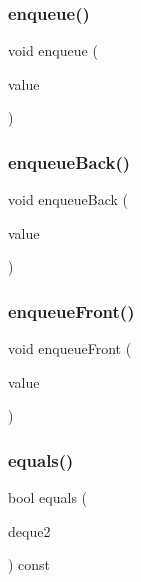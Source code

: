 \mbox{\label{classDeque_a663f69ed5d98f3f167202e9b2d7e7a9a}} 
\subsubsection{\texorpdfstring{enqueue()}{enqueue()}}
{\footnotesize\ttfamily void enqueue (\begin{DoxyParamCaption}\item[{const Value\+Type \&}]{value }\end{DoxyParamCaption})}

\mbox{\label{classDeque_a2fdd7308cc72a3bd03dd6345ef778a65}} 
\subsubsection{\texorpdfstring{enqueue\+Back()}{enqueueBack()}}
{\footnotesize\ttfamily void enqueue\+Back (\begin{DoxyParamCaption}\item[{const Value\+Type \&}]{value }\end{DoxyParamCaption})}

\mbox{\label{classDeque_a12586c9fec2e0dd724cf6ccb4d52c6e8}} 
\subsubsection{\texorpdfstring{enqueue\+Front()}{enqueueFront()}}
{\footnotesize\ttfamily void enqueue\+Front (\begin{DoxyParamCaption}\item[{const Value\+Type \&}]{value }\end{DoxyParamCaption})}

\mbox{\label{classDeque_a2468abeaef57d95b43a90b7462ff88ab}} 
\subsubsection{\texorpdfstring{equals()}{equals()}}
{\footnotesize\ttfamily bool equals (\begin{DoxyParamCaption}\item[{const \mbox{\hyperlink{classDeque}{Deque}}$<$ Value\+Type $>$ \&}]{deque2 }\end{DoxyParamCaption}) const}

